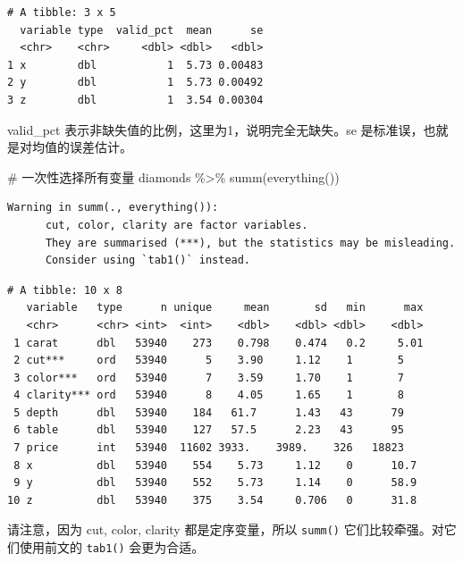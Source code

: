 \documentclass[
  letterpaper,
]{ctexbook}
\newenvironment{Shaded}{\begin{snugshade}}{\end{snugshade}}
\newcommand{\CommentTok}[1]{\textcolor[rgb]{0.37,0.37,0.37}{#1}}
\newcommand{\FunctionTok}[1]{\textcolor[rgb]{0.28,0.35,0.67}{#1}}
\newcommand{\NormalTok}[1]{\textcolor[rgb]{0.00,0.23,0.31}{#1}}
\newcommand{\SpecialCharTok}[1]{\textcolor[rgb]{0.37,0.37,0.37}{#1}}
\begin{document}
\begin{verbatim}
# A tibble: 3 x 5
  variable type  valid_pct  mean      se
  <chr>    <chr>     <dbl> <dbl>   <dbl>
1 x        dbl           1  5.73 0.00483
2 y        dbl           1  5.73 0.00492
3 z        dbl           1  3.54 0.00304
\end{verbatim}

valid\_pct 表示非缺失值的比例，这里为1，说明完全无缺失。se
是标准误，也就是对均值的误差估计。

\begin{Shaded}
\begin{Highlighting}[]
\CommentTok{\# 一次性选择所有变量}
\NormalTok{diamonds }\SpecialCharTok{\%\textgreater{}\%}
  \FunctionTok{summ}\NormalTok{(}\FunctionTok{everything}\NormalTok{())}
\end{Highlighting}
\end{Shaded}

\begin{verbatim}
Warning in summ(., everything()): 
      cut, color, clarity are factor variables.
      They are summarised (***), but the statistics may be misleading.
      Consider using `tab1()` instead.
\end{verbatim}

\begin{verbatim}
# A tibble: 10 x 8
   variable   type      n unique     mean       sd   min      max
   <chr>      <chr> <int>  <int>    <dbl>    <dbl> <dbl>    <dbl>
 1 carat      dbl   53940    273    0.798    0.474   0.2     5.01
 2 cut***     ord   53940      5    3.90     1.12    1       5   
 3 color***   ord   53940      7    3.59     1.70    1       7   
 4 clarity*** ord   53940      8    4.05     1.65    1       8   
 5 depth      dbl   53940    184   61.7      1.43   43      79   
 6 table      dbl   53940    127   57.5      2.23   43      95   
 7 price      int   53940  11602 3933.    3989.    326   18823   
 8 x          dbl   53940    554    5.73     1.12    0      10.7 
 9 y          dbl   53940    552    5.73     1.14    0      58.9 
10 z          dbl   53940    375    3.54     0.706   0      31.8 
\end{verbatim}

请注意，因为 cut, color, clarity 都是定序变量，所以 \texttt{summ()}
它们比较牵强。对它们使用前文的 \texttt{tab1()} 会更为合适。
\end{document}
